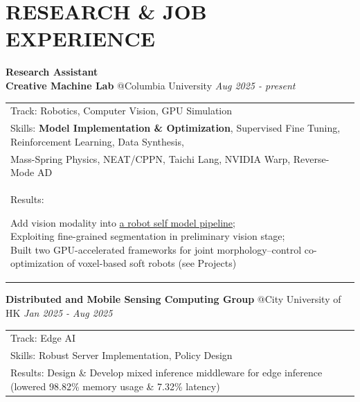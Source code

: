 \documentclass[a4paper,9pt]{extarticle}
\begin{document}
\section*{RESEARCH \& JOB EXPERIENCE}
    \textbf{\Large Research Assistant} \\
    \textbf{Creative Machine Lab} @Columbia University \hfill \textit{Aug 2025 - present}\\
    \vspace{2pt}
    \noindent
    \begin{tabular}{@{$\circ$\hspace{0.5em}} l}
        Track: Robotics, Computer Vision, GPU Simulation \\
        Skills: \textbf{Model Implementation \& Optimization}, Supervised Fine Tuning, Reinforcement Learning, Data Synthesis,\\
        \hspace{2.8em} Mass-Spring Physics, NEAT/CPPN, Taichi Lang, NVIDIA Warp, Reverse-Mode AD\\
        Results:
        \parbox[t]{0.8\textwidth}
        {Add vision modality into \href{https://arxiv.org/pdf/2412.05507}{a robot self model pipeline}; \\
        Exploiting fine-grained segmentation in preliminary vision stage; \\
        Built two GPU-accelerated frameworks for joint morphology--control co-optimization of voxel-based soft robots (see Projects)}
    \end{tabular}
    
    \noindent
    \newline
    \textbf{Distributed and Mobile Sensing Computing Group} @City University of HK \hfill \textit{Jan 2025 - Aug 2025}\\
    \vspace{2pt}
    \noindent
    \begin{tabular}{@{$\circ$\hspace{0.5em}} l}
        Track: Edge AI \\
        Skills:  Robust Server Implementation, Policy Design\\
        Results: Design \& Develop mixed inference middleware for edge inference (lowered 98.82\% memory usage \& 7.32\% latency)
    \end{tabular}

\end{document}
